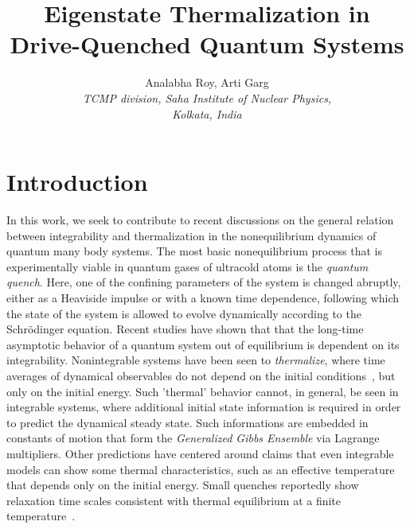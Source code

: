 \documentclass[a4paper,10pt]{article}
\title{Eigenstate Thermalization in Drive-Quenched Quantum Systems}
\author{Analabha Roy, Arti Garg \\
\textit{TCMP division, Saha Institute of Nuclear Physics,}\\ 
\textit{Kolkata, India}}
\begin{document}
\maketitle
\section{\sc Introduction}
In this work, we seek to contribute to recent discussions on the general relation between integrability and thermalization in the nonequilibrium dynamics of quantum many body systems. The most basic nonequilibrium process that is experimentally viable in quantum gases of ultracold atoms is the \textit{quantum quench}. Here, one of the confining parameters of the system is changed abruptly, either as a Heaviside impulse or with a known time dependence, following which the state of the system is allowed to evolve dynamically according to the Schr\"odinger equation. Recent studies have shown that that the long-time asymptotic behavior of a quantum system out of equilibrium is dependent on its integrability. Nonintegrable systems have been seen to \textit{thermalize}, where time averages of dynamical observables do not depend on the initial conditions~\cite{deutsch,olshanii:ipr, rigol:nature, krishnenduda:ethreview}, but only on the initial energy. Such 'thermal' behavior cannot, in general, be seen in integrable systems, where additional initial state information is required in order to predict the dynamical steady state. Such informations are embedded in constants of motion that form the \textit{Generalized Gibbs Ensemble} via Lagrange multipliers. Other predictions have centered around claims that even integrable models can show some thermal characteristics, such as an effective temperature that depends only on the initial energy. Small quenches reportedly show relaxation time scales consistent with thermal equilibrium at a finite temperature~\cite{leticia,rossini}.
\end{document}
